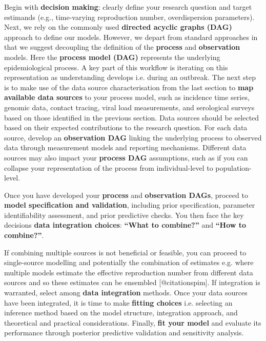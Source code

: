 \documentclass{article}
\begin{document}
Begin with \textbf{decision making}: clearly define your research question and target estimands (e.g., time-varying reproduction number, overdispersion parameters).
Next, we rely on the commonly used \textbf{directed acyclic graphs (DAG)} approach to define our models. However, we depart from standard approaches in that we suggest decoupling the definition of the \textbf{process} and \textbf{observation} models.
Here the \textbf{process model (DAG)} represents the underlying epidemiological process. 
A key part of this workflow is iterating on this representation as understanding develops i.e. during an outbreak.
The next step is to make use of the data source characterisation from the last section to \textbf{map available \textbf{data sources} }to your process model, such as incidence time series, genomic data, contact tracing, viral load measurements, and serological surveys based on those identified in the previous section.
Data sources should be selected based on their expected contributions to the research question.
For each data source, develop an \textbf{observation DAG} linking the underlying process to observed data through measurement models and reporting mechanisms.
Different data sources may also impact your \textbf{process DAG} assumptions, such as if you can collapse your representation of the process from individual-level to population-level.

Once you have developed your \textbf{process} and \textbf{observation DAGs}, proceed to \textbf{model specification and validation}, including prior specification, parameter identifiability assessment, and prior predictive checks.
You then face the key decisions \textbf{data integration choices}: \textbf{``What to combine?''} and \textbf{``How to combine?''}.

If combining multiple sources is not beneficial or feasible, you can proceed to single-source modelling and potentially the combination of estimates e.g. where multiple models estimate the effective reproduction number from different data sources and so these estimates can be ensembled [@citationspim].
If integration is warranted, select among \textbf{data integration} methods. 
Once your data sources have been integrated, it is time to make \textbf{fitting choices} i.e. selecting an inference method based on the model structure, integration approach, and theoretical and practical considerations. 
Finally, \textbf{fit your model} and evaluate its performance through posterior predictive validation and sensitivity analysis.
\end{document}
